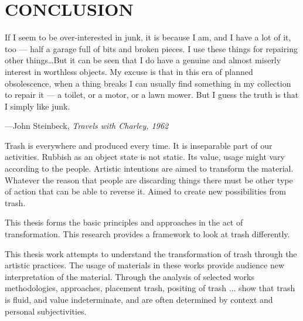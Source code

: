 \chapter{CONCLUSION}





%
%
\begin{singlespace}
\epigraph{If I seem to be over-interested in junk, it is because I am, and I have a lot of it, too --- half a garage full of bits and broken pieces. I use these things for repairing other things\ldots But it can be seen that I do have a genuine and almost miserly interest in worthless objects. My excuse is that in this era of planned obsolescence, when a thing breaks I can usually find something in my collection to repair it --- a toilet, or a motor, or a lawn mower. But I guess the truth is that I simply like junk.}{\hfill---John Steinbeck, \textit{Travels with Charley, 1962}}
\end{singlespace}







Trash is everywhere and produced every time. It is inseparable part of our activities. Rubbish as an object state is not static. Its value, usage might vary according to the people. Artistic intentions are aimed to transform the material. Whatever the reason that people are discarding things there must be other type of action that can be able to reverse it. Aimed to create new possibilities from trash.

This thesis forms the basic principles and approaches in the act of transformation. This research provides a framework to look at trash differently. 

This thesis work attempts to understand the transformation of trash through the artistic practices. The usage of materials in these works provide audience new interpretation of the material. 
Through the analysis of selected works methodologies, approaches, placement trash, positing of trash ...  show that trash is fluid, and value indeterminate, and are often determined by context and personal subjectivities.

